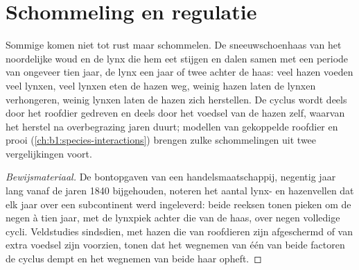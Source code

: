 \section{Schommeling en regulatie}

\begin{proposition}\label{prop:b1:populations:cycles}
Sommige  komen niet tot rust maar schommelen. De sneeuwschoenhaas
van het noordelijke woud en de lynx die hem eet stijgen en dalen samen met
een periode van ongeveer tien jaar, de lynx een jaar of twee achter de haas:
veel hazen voeden veel lynxen, veel lynxen eten de hazen weg, weinig hazen
laten de lynxen verhongeren, weinig lynxen laten de hazen zich herstellen.
De cyclus wordt deels door het roofdier gedreven en deels door het voedsel
van de hazen zelf, waarvan het herstel na overbegrazing jaren duurt;
modellen van gekoppelde roofdier en prooi
(\cref{ch:b1:species-interactions}) brengen zulke schommelingen uit twee
vergelijkingen voort.
\end{proposition}
\begin{proof}[Bewijsmateriaal]
De bontopgaven van een handelsmaatschappij, negentig jaar lang vanaf de
jaren 1840 bijgehouden, noteren het aantal lynx- en hazenvellen dat elk jaar
over een subcontinent werd ingeleverd: beide reeksen tonen pieken om de
negen à tien jaar, met de lynxpiek achter die van de haas, over negen
volledige cycli. Veldstudies sindsdien, met hazen die van roofdieren zijn
afgeschermd of van extra voedsel zijn voorzien, tonen dat het wegnemen van
één van beide factoren de cyclus dempt en het wegnemen van beide haar
opheft.
\end{proof}

